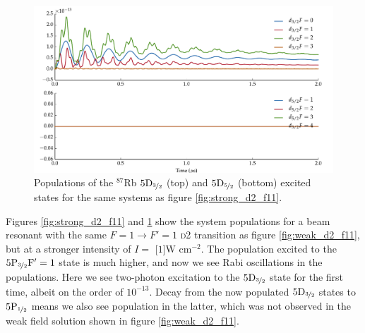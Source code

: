     \begin{figure}%
    \includegraphics[width=\linewidth]
        {figs/05_twophoton/rb87_5spd_hf_solve_b3_fig2.pdf}
    \caption{
    Populations of the $^{87}$Rb $5\rm{D}_{\nicefrac{3}{2}}$ (top) and
    $5\rm{D}_{\nicefrac{5}{2}}$ (bottom) excited states for the same systems as
    figure \ref{fig:strong_d2_f11}.
    }
    \label{fig:strong_d2_f11_D} 
    \end{figure}

    Figures \ref{fig:strong_d2_f11} and \ref{fig:strong_d2_f11_D} show the
    system populations for a beam resonant with the same $F = 1 \rightarrow F' =
    1$ \textsc{d2} transition as figure \ref{fig:weak_d2_f11}, but at a stronger
    intensity of $I = $ \unit[$1$]{W cm$^{-2}$}. The population excited to the
    $5\rm{P}_{\nicefrac{3}{2}} F' = 1$ state is much higher, and now we see Rabi
    oscillations in the populations. Here we see two-photon excitation to the
    $5\rm{D}_{\nicefrac{3}{2}}$ state for the first time, albeit on the order of
    $10^{-13}$. Decay from the now populated $5\rm{D}_{\nicefrac{3}{2}}$ states
    to $5\rm{P}_{\nicefrac{1}{2}}$ means we also see population in the latter,
    which was not observed in the weak field solution shown in figure
    \ref{fig:weak_d2_f11}.

